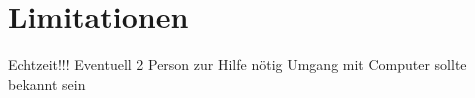 \section{Limitationen}

\noindent Echtzeit!!!
\noindent Eventuell 2 Person zur Hilfe nötig
\noindent Umgang mit Computer sollte bekannt sein

